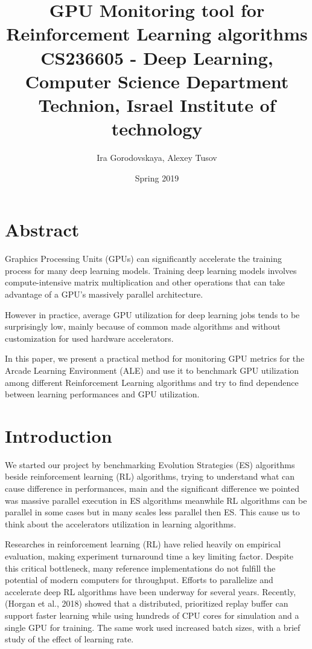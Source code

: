 \documentclass[11 pt, twocolumn]{article}
\title{\textbf{GPU Monitoring tool for Reinforcement Learning algorithms}\\\Large CS236605 - Deep Learning, Computer Science Department\\Technion, Israel Institute of technology}
\author{Ira Gorodovskaya, Alexey Tusov}
\date{Spring 2019}
\begin{document}
\maketitle
\section{Abstract}
Graphics Processing Units (GPUs) can significantly accelerate the training process for many deep learning models. Training deep learning models involves compute-intensive matrix multiplication and other operations that can take advantage of a GPU's massively parallel architecture.

However in practice, average GPU utilization for deep learning jobs tends to be surprisingly low, mainly because of common made algorithms and without customization for used hardware accelerators.

In this paper, we present a practical method for monitoring GPU metrics for the Arcade Learning Environment (ALE) and use it to benchmark GPU utilization among different Reinforcement Learning algorithms and try to find dependence between learning performances and GPU utilization.


\section{Introduction}
We started our project by benchmarking Evolution Strategies (ES) algorithms beside reinforcement learning (RL) algorithms, trying to understand what can cause difference in performances, main and the significant difference we pointed was massive parallel execution in ES algorithms meanwhile RL algorithms can be parallel in some cases but in many scales less parallel then ES. This cause us to think about the accelerators utilization in learning algorithms.


Researches in reinforcement learning (RL) have relied heavily on empirical evaluation, making experiment turnaround time a key limiting factor. Despite this critical bottleneck, many reference implementations do not fulfill
the potential of modern computers for throughput.
Efforts to parallelize and accelerate deep RL algorithms have been underway for several years. Recently, (Horgan et al., 2018\cite{horgan2018distributed}) showed that a distributed, prioritized replay buffer can support faster
learning while using hundreds of CPU cores for simulation and a single GPU for training. The same work used increased batch sizes, with a brief study of the effect of
learning rate.
\end{document}
